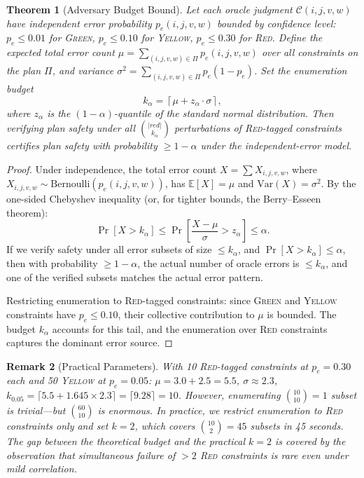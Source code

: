 \documentclass[10pt,twocolumn]{article}
\newtheorem{theorem}{Theorem}[section]
\newtheorem{remark}[theorem]{Remark}
\begin{document}
\begin{theorem}[Adversary Budget Bound]
\label{thm:adversary}
Let each oracle judgment $\mathcal{C}(i,j,v,w)$ have independent error probability $p_e(i,j,v,w)$ bounded by confidence level: $p_e \leq 0.01$ for \textsc{Green}, $p_e \leq 0.10$ for \textsc{Yellow}, $p_e \leq 0.30$ for \textsc{Red}. Define the expected total error count $\mu = \sum_{(i,j,v,w) \in \Pi} p_e(i,j,v,w)$ over all constraints on the plan $\Pi$, and variance $\sigma^2 = \sum_{(i,j,v,w) \in \Pi} p_e(1 - p_e)$. Set the enumeration budget
\[
  k_\alpha = \left\lceil \mu + z_\alpha \cdot \sigma \right\rceil,
\]
where $z_\alpha$ is the $(1-\alpha)$-quantile of the standard normal distribution. Then verifying plan safety under all $\binom{|\mathit{red}|}{k_\alpha}$ perturbations of \textsc{Red}-tagged constraints certifies plan safety with probability $\geq 1 - \alpha$ under the independent-error model.
\end{theorem}

\begin{proof}
Under independence, the total error count $X = \sum X_{i,j,v,w}$, where $X_{i,j,v,w} \sim \mathrm{Bernoulli}(p_e(i,j,v,w))$, has $\mathbb{E}[X] = \mu$ and $\mathrm{Var}(X) = \sigma^2$. By the one-sided Chebyshev inequality (or, for tighter bounds, the Berry--Esseen theorem):
\[
  \Pr[X > k_\alpha] \leq \Pr\!\left[\frac{X - \mu}{\sigma} > z_\alpha\right] \leq \alpha.
\]
If we verify safety under all error subsets of size $\leq k_\alpha$, and $\Pr[X > k_\alpha] \leq \alpha$, then with probability $\geq 1-\alpha$, the actual number of oracle errors is $\leq k_\alpha$, and one of the verified subsets matches the actual error pattern.

Restricting enumeration to \textsc{Red}-tagged constraints: since \textsc{Green} and \textsc{Yellow} constraints have $p_e \leq 0.10$, their collective contribution to $\mu$ is bounded. The budget $k_\alpha$ accounts for this tail, and the enumeration over \textsc{Red} constraints captures the dominant error source.
\end{proof}

\begin{remark}[Practical Parameters]
With 10 \textsc{Red}-tagged constraints at $p_e = 0.30$ each and 50 \textsc{Yellow} at $p_e = 0.05$: $\mu = 3.0 + 2.5 = 5.5$, $\sigma \approx 2.3$, $k_{0.05} = \lceil 5.5 + 1.645 \times 2.3 \rceil = \lceil 9.28 \rceil = 10$. However, enumerating $\binom{10}{10} = 1$ subset is trivial---but $\binom{60}{10}$ is enormous. In practice, we restrict enumeration to \textsc{Red} constraints only and set $k = 2$, which covers $\binom{10}{2} = 45$ subsets in 45 seconds. The gap between the theoretical budget and the practical $k=2$ is covered by the observation that simultaneous failure of $>2$ \textsc{Red} constraints is rare even under mild correlation.
\end{remark}
\end{document}
